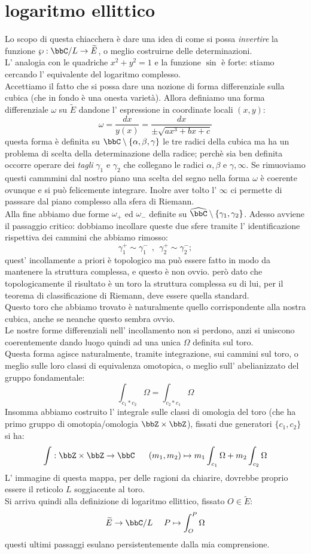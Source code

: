 \section{logaritmo ellittico}
Lo scopo di questa chiacchera è dare una idea di come si possa {\it invertire} la funzione $\wp: \bbC/L \rar \widetilde{E}$, o meglio costruirne delle determinazioni.\\
L' analogia con le quadriche $x^2+y^2=1$ e la funzione $\sin$ è forte: stiamo cercando l' equivalente del logaritmo complesso.\\
Accettiamo il fatto che si possa dare una nozione di forma differenziale sulla cubica (che in fondo è una onesta varietà). Allora definiamo una forma differenziale $\omega$ su $\widetilde{E}$ dandone l' espressione in coordinate locali $(x,y)$:
$$
\omega=\frac{dx}{y(x)}=\frac{dx}{\pm\sqrt{ax^3+bx+c}}
$$
questa forma è definita su $\bbC\setminus\{\alpha, \beta, \gamma\}$ le tre radici della cubica ma ha un problema di scelta della determinazione della radice; perchè sia ben definita occorre operare dei {\it tagli} $\gamma_1$ e $\gamma_2$ che collegano le radici $\alpha,\beta$ e $\gamma,\infty$. Se rimuoviamo questi cammmini dal nostro piano una scelta del segno nella forma $\omega$ è coerente ovunque e si può felicemente integrare. Inolre aver tolto l' $\infty$ ci permette di passsare dal piano complesso alla sfera di Riemann.\\
Alla fine abbiamo due forme $\omega_+$ ed $\omega_-$ definite su $\widehat{\bbC}\setminus\{\gamma_1,\gamma_2\}$. Adesso avviene il passaggio critico: dobbiamo incollare queste due sfere tramite l' identificazione rispettiva dei cammini che abbiamo rimosso:
$$
\gamma_1^+\sim \gamma_1^-\ \ , \ \ \gamma_2^+\sim\gamma_2^-;
$$
quest' incollamente a priori è topologico ma può essere fatto in modo da mantenere la struttura complessa, e questo è non ovvio. però dato che topologicamente il risultato è un toro la struttura complessa su di lui, per il teorema di classificazione di Riemann, deve essere quella standard.\\
Questo toro che abbiamo trovato è naturalmente quello corrispondente alla nostra cubica, anche se neanche questo sembra ovvio.\\
Le nostre forme differenziali nell' incollamento non si perdono, anzi si uniscono coerentemente dando luogo quindi ad una unica $\Omega$ definita sul toro.\\
Questa forma agisce naturalmente, tramite integrazione, sui cammini sul toro, o meglio sulle loro classi di equivalenza omotopica, o meglio sull' abelianizzato del gruppo fondamentale:
$$
\int_{c_1 * c_2} \Omega=\int_{c_2 * c_1} \Omega
$$ 
Insomma abbiamo costruito l' integrale sulle classi di omologia del toro (che ha primo gruppo di omotopia/omologia $\bbZ\times \bbZ $), fissati due generatori $\{c_1,c_2\}$ si ha:
$$
\int: \bbZ\times \bbZ \rar \bbC \ \ \ \ \ (m_1,m_2)\mapsto m_1 \int_{c_1} \Omega+m_2 \int_{c_2} \Omega  
$$
L' immagine di questa mappa, per delle ragioni da chiarire, dovrebbe proprio essere il reticolo $L$ soggiacente al toro.\\
Si arriva quindi alla definizione di logaritmo ellittico, fissato $O\in \widetilde{E}$:
$$
\widetilde{E}\rar \bbC/L\ \ \ \ P\mapsto \int_O^P \Omega  
$$
questi ultimi passaggi esulano persistentemente dalla mia comprensione.
